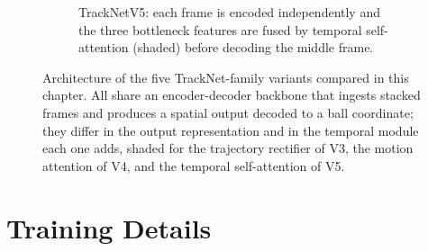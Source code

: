 \begin{figure}[p]
  \vspace{0.8em}
  \begin{subfigure}{\textwidth}
    \centering
    \caption{TrackNetV5: each frame is encoded independently and the three
      bottleneck features are fused by temporal self-attention (shaded) before
      decoding the middle frame.}
    \label{fig:arch-v5}
  \end{subfigure}

  \caption{Architecture of the five TrackNet-family variants compared in this
    chapter. All share an encoder-decoder backbone that ingests stacked frames
    and produces a spatial output decoded to a ball coordinate; they differ in
    the output representation and in the temporal module each one adds, shaded
    for the trajectory rectifier of V3, the motion attention of V4, and the
    temporal self-attention of V5.}
  \label{fig:ball-arch}
\end{figure}

\section{Training Details}
\label{sec:ball-training}

